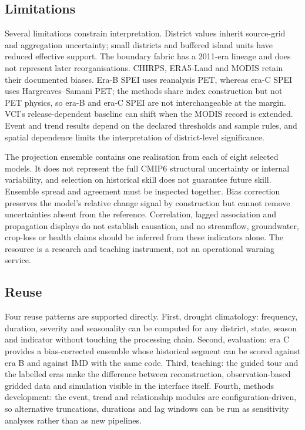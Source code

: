 \documentclass[10pt,a4paper]{article}
\begin{document}
\subsection*{Limitations}
Several limitations constrain interpretation. District values inherit source-grid and aggregation uncertainty; small districts and buffered island units have reduced effective support. The boundary fabric has a 2011-era lineage and does not represent later reorganisations. CHIRPS, ERA5-Land and MODIS retain their documented biases. Era-B SPEI uses reanalysis PET, whereas era-C SPEI uses Hargreaves--Samani PET; the methods share index construction but not PET physics, so era-B and era-C SPEI are not interchangeable at the margin. VCI's release-dependent baseline can shift when the MODIS record is extended. Event and trend results depend on the declared thresholds and sample rules, and spatial dependence limits the interpretation of district-level significance.

The projection ensemble contains one realisation from each of eight selected models. It does not represent the full CMIP6 structural uncertainty or internal variability, and selection on historical skill does not guarantee future skill. Ensemble spread and agreement must be inspected together. Bias correction preserves the model's relative change signal by construction but cannot remove uncertainties absent from the reference. Correlation, lagged association and propagation displays do not establish causation, and no streamflow, groundwater, crop-loss or health claims should be inferred from these indicators alone. The resource is a research and teaching instrument, not an operational warning service.

\subsection*{Reuse}
Four reuse patterns are supported directly. First, drought climatology: frequency, duration, severity and seasonality can be computed for any district, state, season and indicator without touching the processing chain. Second, evaluation: era C provides a bias-corrected ensemble whose historical segment can be scored against era B and against IMD with the same code. Third, teaching: the guided tour and the labelled eras make the difference between reconstruction, observation-based gridded data and simulation visible in the interface itself. Fourth, methods development: the event, trend and relationship modules are configuration-driven, so alternative truncations, durations and lag windows can be run as sensitivity analyses rather than as new pipelines.
\end{document}
